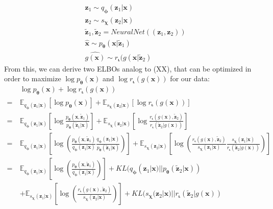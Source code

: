 \documentclass[12pt]{report}
\theoremstyle{definition}
\begin{document}
\begin{equation}
\begin{split}
& \mathbf{z}_1 \sim q_{\mathbf{\phi}}(\mathbf{z}_1|\mathbf{x}) \\
& \mathbf{z}_2 \sim s_{\mathbf{\chi}}(\mathbf{z}_2|\mathbf{x}) \\
& \tilde{\mathbf{z}}_1, \tilde{\mathbf{z}}_2 = NeuralNet((\mathbf{z}_1, \mathbf{z}_2)) \\
& \hat{\mathbf{x}} \sim p_{\mathbf{\theta}}(\mathbf{x}|\tilde{\mathbf{z}}_1) \\ 
& \hat{g(\mathbf{x})} \sim r_{\mathbf{\iota}}(g(\mathbf{x}|\tilde{\mathbf{z}}_2)
\end{split}
\end{equation}
From this, we can derive two ELBOs analog to (XX), that can be optimized in order to maximize $\log p_{\mathbf{\theta}}(\mathbf{x})$ and $\log r_{\mathbf{\iota}}(g(\mathbf{x}))$ for our data:
\begin{equation}
\begin{split}
 & \log p_{\mathbf{\theta}}(\mathbf{x}) + \log r_{\mathbf{\iota}}(g(\mathbf{x}))   \\
	= \ & \mathbb{E}_{q_{\mathbf{\phi}}(\mathbf{z}_1|\mathbf{x})}\left[\log p_{\mathbf{\theta}}(\mathbf{x})\right] + \mathbb{E}_{s_{\mathbf{\chi}}(\mathbf{z}_2|\mathbf{x})}\left[\log r_{\mathbf{\iota}}(g(\mathbf{x}))\right] \\
	= \ & \mathbb{E}_{q_{\mathbf{\phi}}(\mathbf{z}_1|\mathbf{x})}\left[ \log \frac{p_{\mathbf{\theta}}(\mathbf{x}, \tilde{\mathbf{z}}_1)}{p_{\mathbf{\theta}}(\tilde{\mathbf{z}}_1|\mathbf{x})} \right] 
	+ \mathbb{E}_{s_{\mathbf{\chi}}(\mathbf{z}_2|\mathbf{x})}\left[ \log \frac{r_{\mathbf{\iota}}(g(\mathbf{x}), \tilde{\mathbf{z}}_2)}{r_{\mathbf{\iota}}(\tilde{\mathbf{z}}_2|g(\mathbf{x}))} \right] \\
	= \ & \mathbb{E}_{q_{\mathbf{\phi}}(\mathbf{z}_1|\mathbf{x})}\left[ \log \left( \frac{p_{\mathbf{\theta}}(\mathbf{x}, \tilde{\mathbf{z}}_1)}{q_{\mathbf{\phi}}(\mathbf{z}_1|\mathbf{x})}\frac{q_{\mathbf{\phi}}(\mathbf{z}_1|\mathbf{x})}{p_{\mathbf{\theta}}(\tilde{\mathbf{z}}_1|\mathbf{x})}\right) \right] 
	+ \mathbb{E}_{s_{\mathbf{\chi}}(\mathbf{z}_2|\mathbf{x})}\left[ \log \left( \frac{r_{\mathbf{\iota}}(g(\mathbf{x}), \tilde{\mathbf{z}}_2)}{s_{\mathbf{\chi}}(\mathbf{z}_1|\mathbf{x})}\frac{s_{\mathbf{\chi}}(\mathbf{z}_1|\mathbf{x})}{r_{\mathbf{\iota}}(\tilde{\mathbf{z}}_2|g(\mathbf{x}))} \right) \right] \\
	= \ & \mathbb{E}_{q_{\mathbf{\phi}}(\mathbf{z}_1|\mathbf{x})}\left[ \log\left(\frac{p_{\mathbf{\theta}}(\mathbf{x}, \tilde{\mathbf{z}}_1)}{q_{\mathbf{\phi}}(\mathbf{z}_1|\mathbf{x})}\right) \right] + KL(q_{\mathbf{\phi}}(\mathbf{z}_1|\mathbf{x}) || p_{\mathbf{\theta}}(\tilde{\mathbf{z}}_2| \mathbf{x})) \\
	& + \mathbb{E}_{s_{\mathbf{\chi}}(\mathbf{z}_1|\mathbf{x})}\left[ \log\left(\frac{r_{\mathbf{\iota}}(g(\mathbf{x}), \tilde{\mathbf{z}}_2)}{s_{\mathbf{\chi}}(\mathbf{z}_2|\mathbf{x})}\right) \right] + KL(s_{\mathbf{\chi}}(\mathbf{z}_2|\mathbf{x}) || r_{\mathbf{\iota}}(\tilde{\mathbf{z}}_2| g(\mathbf{x})) \\
\end{split}
\end{equation}
\end{document}
